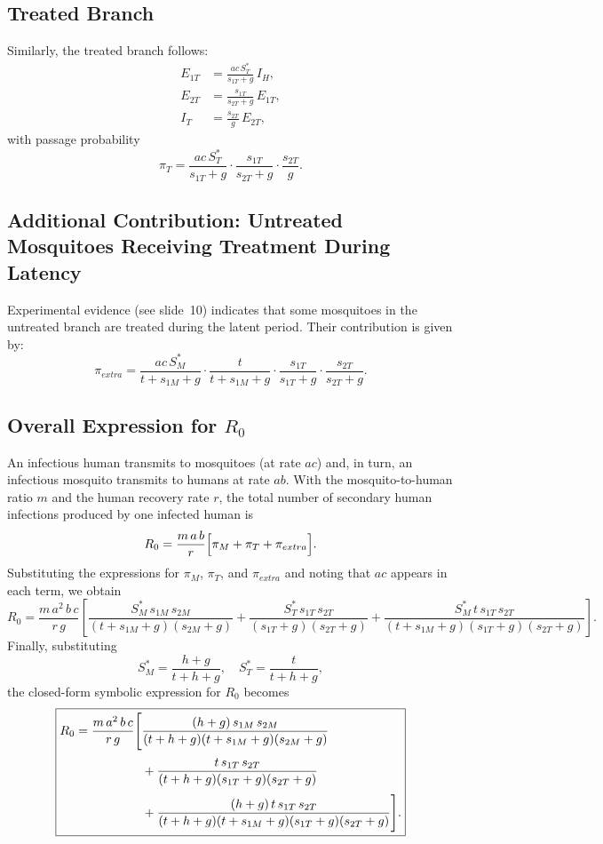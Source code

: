 \documentclass{article}
\begin{document}
\subsection*{Treated Branch}
Similarly, the treated branch follows:
\[
\begin{aligned}
E_{1T}&=\frac{ac\,S_T^*}{s_{1T}+g}\,I_H,\\[1mm]
E_{2T}&=\frac{s_{1T}}{s_{2T}+g}\,E_{1T},\\[1mm]
I_T&=\frac{s_{2T}}{g}\,E_{2T},
\end{aligned}
\]
with passage probability
\[
\pi_T=\frac{ac\,S_T^*}{s_{1T}+g}\cdot\frac{s_{1T}}{s_{2T}+g}\cdot\frac{s_{2T}}{g}.
\]

\subsection*{Additional Contribution: Untreated Mosquitoes Receiving Treatment During Latency}
Experimental evidence (see slide~10) indicates that some mosquitoes in the untreated branch are treated during the latent period. Their contribution is given by:
\[
\pi_{extra}=\frac{ac\,S_M^*}{t+s_{1M}+g}\cdot\frac{t}{t+s_{1M}+g}\cdot\frac{s_{1T}}{s_{1T}+g}\cdot\frac{s_{2T}}{s_{2T}+g}.
\]

\subsection*{Overall Expression for \(R_0\)}
An infectious human transmits to mosquitoes (at rate \(ac\)) and, in turn, an infectious mosquito transmits to humans at rate \(ab\). With the mosquito-to-human ratio \(m\) and the human recovery rate \(r\), the total number of secondary human infections produced by one infected human is
\[
R_0=\frac{m\,a\,b}{r}\Bigl[\pi_M+\pi_T+\pi_{extra}\Bigr].
\]
Substituting the expressions for \(\pi_M\), \(\pi_T\), and \(\pi_{extra}\) and noting that \(ac\) appears in each term, we obtain
\[
R_0=\frac{m\,a^2\,b\,c}{r\,g}\left[\frac{S_M^*\,s_{1M}\,s_{2M}}{(t+s_{1M}+g)(s_{2M}+g)}
+\frac{S_T^*\,s_{1T}\,s_{2T}}{(s_{1T}+g)(s_{2T}+g)}
+\frac{S_M^*\,t\,s_{1T}\,s_{2T}}{(t+s_{1M}+g)(s_{1T}+g)(s_{2T}+g)}
\right].
\]
Finally, substituting
\[
S_M^*=\frac{h+g}{t+h+g},\quad S_T^*=\frac{t}{t+h+g},
\]
the closed-form symbolic expression for \(R_0\) becomes
\begin{equation}
    \boxed{%
    \begin{split}
    R_0=\frac{m\,a^2\,b\,c}{r\,g}\Biggl[&\frac{(h+g)\,s_{1M}\,s_{2M}}{(t+h+g)(t+s_{1M}+g)(s_{2M}+g)}\\[1mm]
    &+\frac{t\,s_{1T}\,s_{2T}}{(t+h+g)(s_{1T}+g)(s_{2T}+g)}\\[1mm]
    &+\frac{(h+g)\,t\,s_{1T}\,s_{2T}}{(t+h+g)(t+s_{1M}+g)(s_{1T}+g)(s_{2T}+g)}
    \Biggr].
    \end{split}
    }
\end{equation}
    
\end{document}
